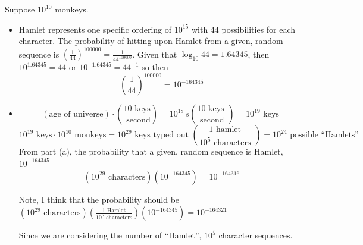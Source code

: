Suppose $10^{10}$ monkeys.  
\begin{itemize}
\item[(a)] Hamlet represents one specific ordering of $10^{15}$ with 44 possibilities for each character.  The probability of hitting upon Hamlet from a given, random sequence is $\left( \frac{1}{44} \right)^{100000} = \boxed{ \frac{1}{44^{100000}} }$.  Given that $\log_{10}{44} = 1.64345$, then $10^{1.64345} = 44$ or $10^{-1.64345} = 44^{-1}$ so then 
\[
\left( \frac{1}{44} \right)^{100000} = 10^{-164345}
\]
\item[(b)] 
\[
(\text{age of universe})\cdot \left( \frac{ 10 \text{ keys} }{ \text{ second} } \right) = 10^{18} \, s \left( \frac{ 10 \text{ keys }}{ \text{ second } } \right) = 10^{19} \text{ keys }
\]
\[
10^{19} \text{ keys} \cdot 10^{10} \text{ monkeys} = 10^{29} \text{ keys typed out } \left( \frac{ 1 \text{ hamlet } }{ 10^5 \text{ characters } } \right) = 10^{24} \text{ possible ``Hamlets'' }
\]
From part (a), the probability that a given, random sequence is Hamlet, $10^{-164345}$
\[
(10^{29} \text{ characters})( 10^{-164345}) =  10^{-164316} 
\]

Note, I think that the probability should be $(10^{29} \text{ characters})\left( \frac{ 1 \text{ Hamlet}}{ 10^5 \text{ characters} } \right)(10^{-164345} ) = 10^{-164321}$

Since we are considering the number of ``Hamlet'', $10^5$ character sequences.  
\end{itemize}


